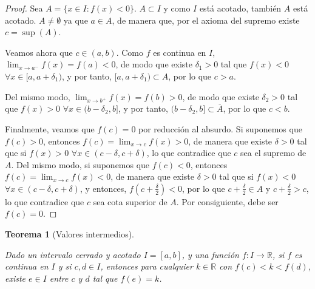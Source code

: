 \documentclass[
  a4paper,
]{scrreport}
\theoremstyle{definition}
\theoremstyle{plain}
\theoremstyle{definition}
\theoremstyle{definition}
\theoremstyle{plain}
\newtheorem{theorem}{Teorema}[chapter]
\theoremstyle{plain}
\theoremstyle{remark}
\begin{document}
\begin{tcolorbox}[enhanced jigsaw, leftrule=.75mm, colbacktitle=quarto-callout-note-color!10!white, toprule=.15mm, opacityback=0, opacitybacktitle=0.6, toptitle=1mm, breakable, bottomtitle=1mm, colframe=quarto-callout-note-color-frame, rightrule=.15mm, titlerule=0mm, title=\textcolor{quarto-callout-note-color}{\faInfo}\hspace{0.5em}{Demostración}, arc=.35mm, left=2mm, bottomrule=.15mm, colback=white, coltitle=black]

\begin{proof}
Sea \(A=\{x\in I: f(x)<0\}\). \(A\subset I\) y como \(I\) está acotado,
también \(A\) está acotado. \(A\neq\emptyset\) ya que \(a\in A\), de
manera que, por el axioma del supremo existe \(c=\sup(A)\).

Veamos ahora que \(c\in(a,b)\). Como \(f\) es continua en \(I\),
\(\lim_{x\to a^-}f(x)=f(a)<0\), de modo que existe \(\delta_1>0\) tal
que \(f(x)<0\) \(\forall x\in [a,a+\delta_1)\), y por tanto,
\([a,a+\delta_1)\subset A\), por lo que \(c>a\).

Del mismo modo, \(\lim_{x\to b^+}f(x)=f(b)>0\), de modo que existe
\(\delta_2>0\) tal que \(f(x)>0\) \(\forall x\in (b-\delta_2,b]\), y por
tanto, \((b-\delta_2,b]\subset \overline{A}\), por lo que \(c<b\).

Finalmente, veamos que \(f(c)=0\) por reducción al absurdo. Si suponemos
que \(f(c)>0\), entonces \(f(c)=\lim_{x\to c} f(x)>0\), de manera que
existe \(\delta>0\) tal que si \(f(x)>0\)
\(\forall x\in(c-\delta, c+\delta)\), lo que contradice que \(c\) sea el
supremo de \(A\). Del mismo modo, si suponemos que \(f(c)<0\), entonces
\(f(c)=\lim_{x\to c} f(x)<0\), de manera que existe \(\delta>0\) tal que
si \(f(x)<0\) \(\forall x\in(c-\delta, c+\delta)\), y entonces,
\(f\left(c+\frac{\delta}{2}\right)<0\), por lo que
\(c+\frac{\delta}{2}\in A\) y \(c+\frac{\delta}{2}>c\), lo que
contradice que \(c\) sea cota superior de \(A\). Por consiguiente, debe
ser \(f(c)=0\).
\end{proof}

\end{tcolorbox}

\begin{theorem}[Valores
intermedios]\protect\hypertarget{thm-valores-intermedios}{}\label{thm-valores-intermedios}

Dado un intervalo cerrado y acotado \(I=[a,b]\), y una función
\(f:I\to\mathbb{R}\), si \(f\) es continua en \(I\) y si \(c,d\in I\),
entonces para cualquier \(k\in\mathbb{R}\) con \(f(c)<k<f(d)\), existe
\(e\in I\) entre \(c\) y \(d\) tal que \(f(e)=k\).

\end{theorem}
\end{document}
